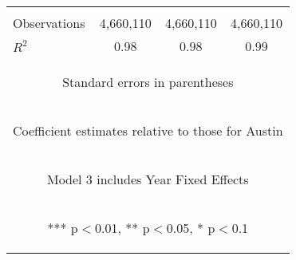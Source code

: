 \begin{center}
\begin{tabular}{lccc}
\vspace{4pt} & \begin{footnotesize}\end{footnotesize} & \begin{footnotesize}\end{footnotesize} & \begin{footnotesize}\end{footnotesize} \\
Observations & 4,660,110 & 4,660,110 & 4,660,110 \\
 $R^2$ & 0.98 & 0.98 & 0.99 \\ \hline
\multicolumn{4}{c}{\begin{footnotesize} Standard errors in parentheses\end{footnotesize}} \\
\multicolumn{4}{c}{\begin{footnotesize} Coefficient estimates relative to those for Austin\end{footnotesize}} \\
\multicolumn{4}{c}{\begin{footnotesize} Model 3 includes Year Fixed Effects\end{footnotesize}} \\
\multicolumn{4}{c}{\begin{footnotesize} *** p$<$0.01, ** p$<$0.05, * p$<$0.1\end{footnotesize}} \\
\end{tabular}
\end{center}
